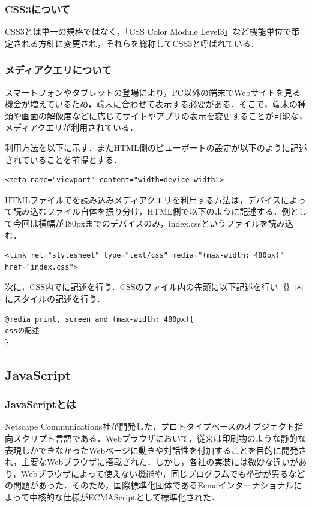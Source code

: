\documentclass[a4j,12pt]{jarticle}
\begin{document}
\subsubsection{CSS3について}
CSS3とは単一の規格ではなく，「CSS Color Module Level3」など機能単位で策定される方針に変更され，それらを総称してCSS3と呼ばれている．
\subsubsection{メディアクエリについて}
スマートフォンやタブレットの登場により，PC以外の端末でWebサイトを見る機会が増えているため，端末に合わせて表示する必要がある．そこで，端末の種類や画面の解像度などに応じてサイトやアプリの表示を変更することが可能な，メディアクエリが利用されている\cite{ren9}．

利用方法を以下に示す．またHTML側のビューポートの設定が以下のように記述されていることを前提とする．
\begin{lstlisting}[caption=HTML側のビューポートの設定,label=s1]
<meta name="viewport" content="width=device-width">
  \end{lstlisting}

HTMLファイルでを読み込みメディアクエリを利用する方法は，デバイスによって読み込むファイル自体を振り分け，HTML側で以下のように記述する．例として今回は横幅が480pxまでのデバイスのみ，index.cssというファイルを読み込む．
\begin{lstlisting}[caption=ファイルを読み込む,label=s2]
 <link rel="stylesheet" type="text/css" media="(max-width: 480px)" href="index.css">  \end{lstlisting}
 
次に，CSS内でに記述を行う．CSSのファイル内の先頭に以下記述を行い｛｝内にスタイルの記述を行う．
\begin{lstlisting}[caption=CSSの記述例,label=s3]
@media print, screen and (max-width: 480px){
cssの記述
}
\end{lstlisting}

\subsection{JavaScript}
\subsubsection{JavaScriptとは}
Netscape Communications社が開発した，プロトタイプベースのオブジェクト指向スクリプト言語である．Webブラウザにおいて，従来は印刷物のような静的な表現しかできなかったWebページに動きや対話性を付加することを目的に開発され，主要なWebブラウザに搭載された．しかし，各社の実装には微妙な違いがあり，Webブラウザによって使えない機能や，同じプログラムでも挙動が異るなどの問題があった．そのため，国際標準化団体であるEcmaインターナショナルによって中核的な仕様がECMAScriptとして標準化された．
\end{document}
